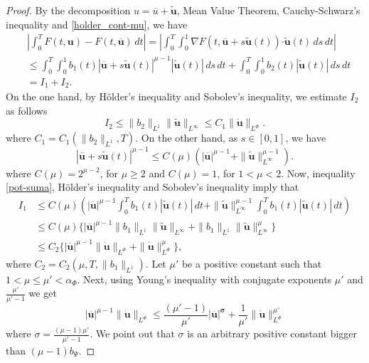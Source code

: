 \documentclass[twoside]{article}
\theoremstyle{remark}
\newcommand{\orlnor}{\|_{L^{\Phi}}}
\renewcommand{\b}[1]{\boldsymbol{#1}}
\newcommand{\ccdot}{\b{\cdot}}
\renewcommand{\leq}{\leqslant}
\begin{document}
\begin{proof} 
By the decomposition $u=\overline{u}+\b{\tilde{u}}$,  Mean Value Theorem, Cauchy-Schwarz's inequality 
and \eqref{holder_cont-mu}, we have
\begin{equation}\label{cota-diferencia-F}
\begin{split}
&\left|\int_0^T F(t,\b{u})-F(t,\b{\overline{u}})\,dt\right|=
\left|\int_0^T \int_0^1 \nabla F(t,\b{\overline{u}}+s\b{\tilde{u}}(t))\ccdot \b{\tilde{u}}(t) \,ds \,dt\right|
\\
&\leq \int_0^T \int_0^1 b_1(t)|\b{\overline{u}}+s\b{\tilde{u}}(t)|^{\mu-1}|\b{\tilde{u}}(t)|\,ds\,dt+
\int_0^T \int_0^1 b_2(t)|\b{\tilde{u}}(t)|\,ds\,dt
\\
&=I_1+I_2.
\end{split}
\end{equation}
On the one hand, by H\"older's inequality and Sobolev's inequality, we estimate $I_2$ as follows
\begin{equation}\label{cota-i2}
I_2\leq \|b_2\|_{L^1} \|\b{\tilde{u}}\|_{L^{\infty}}\leq
C_1\|\b{\dot u}\orlnor.
\end{equation}
 where $C_1=C_1(\|b_2\|_{L^1}, T)$. On the other hand, as $s\in [0,1]$, we have
\begin{equation}\label{pot-suma}
|\b{\overline{u}}+s\b{\tilde{u}}(t)|^{\mu-1}\leq
C(\mu)(|\b{\overline{u}}|^{\mu-1}+\|\b{\tilde{u}}\|_{L^{\infty}}^{\mu-1}).
\end{equation}
where $C(\mu)=2^{\mu-2}$, for $\mu\geq 2$ and $C(\mu)=1$, for $1<\mu<2$. Now,  inequality \eqref{pot-suma}, H\"older's inequality and Sobolev's inequality imply that
\begin{equation}\label{cota-i1}
\begin{split}
I_1&\leq 
C(\mu)\left(|\b{\overline{u}}|^{\mu-1} \int_0^T b_1(t) |\b{\tilde{u}}(t)|\,dt+
\|\b{\tilde{u}}\|^{\mu-1}_{L^{\infty}} \int_0^T b_1(t)|\b{\tilde{u}}(t)| \,dt\right)
\\
&\leq C(\mu)\bigg\{ |\b{\overline{u}}|^{\mu-1} \|b_1\|_{L^1} \|\b{\tilde{u}}\|_{L^{\infty}}+
 \|b_1\|_{L^1}\|\b{\tilde{u}}\|^{\mu}_{L^\infty}\bigg\}
\\
&\leq C_2 \bigg\{ |\b{\overline{u}}|^{\mu-1} \|\b{\dot{u}}\orlnor+ \|\b{\dot u}\orlnor^{\mu}\bigg\},
\end{split}
\end{equation}
where $C_2=C_2(\mu,T, \|b_1\|_{L^1} )$. Let $\mu'$ be a positive constant such that $1<\mu\leq \mu'<\alpha_{\Phi}$. 
Next, using Young's inequality with conjugate exponents $\mu'$ and $\frac{\mu'}{\mu'-1}$ 
 we get
\begin{equation}\label{cota-i1-parcial}
|\b{\overline{u}}|^{\mu-1}   \|\b{\dot{u}}\orlnor
\leq \frac{(\mu'-1)}{\mu'}|\b{\overline{u}|^{\sigma}}
+\frac{1}{\mu'} \|\b{\dot{u}}\orlnor^{\mu'}
\end{equation}
where $\sigma=\frac{(\mu-1) \mu'}{\mu'-1}$. We point out that $\sigma$ is an arbitrary positive constant bigger than $(\mu-1)b_{\Psi}$.


\end{proof}
\end{document}
